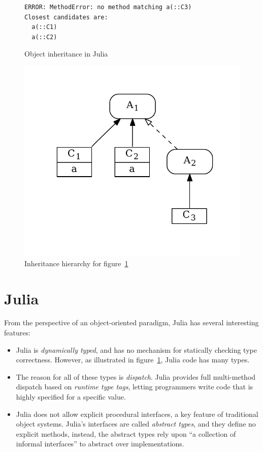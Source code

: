 \documentclass[preprint]{sigplanconf}
\begin{document}
\begin{figure}[h]


\begin{Verbatim}[fontsize=\small]
ERROR: MethodError: no method matching a(::C3)
Closest candidates are:
  a(::C1)
  a(::C2)
\end{Verbatim}
\caption{Object inheritance in Julia}
\label{code:broken}
\end{figure}


\begin{figure}
\centering
\includegraphics[scale=.6]{example2.pdf}
\caption{Inheritance hierarchy for figure~\ref{code:broken}}
\label{fig:algo}
\end{figure}

\section{Julia}

From the perspective of an object-oriented paradigm, Julia has several interesting features:
\begin{itemize}
\item Julia is \emph{dynamically typed}, and has no mechanism for statically
checking type correctness. However, as illustrated in figure~\ref{code:broken},
Julia code has many types.
\item The reason for all of these types is \emph{dispatch}. Julia provides 
full multi-method dispatch based on \emph{runtime type tags}, letting programmers
write code that is highly specified for a specific value.
\item Julia does not allow explicit procedural interfaces, a key feature of traditional 
object systems. Julia's interfaces are called \emph{abstract types}, and they 
define no explicit methods, instead, the abstract types rely upon ``a collection of informal interfaces''
\cite{juliadocu} to abstract over implementations.
\end{itemize}
\end{document}

